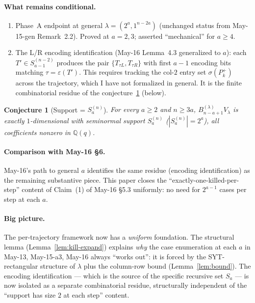 \documentclass[11pt]{article}
\newtheorem{conjecture}[theorem]{Conjecture}
\theoremstyle{definition}
\begin{document}
\paragraph{What remains conditional.}
\begin{enumerate}[leftmargin=2em,topsep=0.3em,itemsep=0.2em]
\item Phase~A endpoint at general $\lambda=(2^a,1^{n-2a})$
(unchanged status from May-15-gen Remark~2.2).  Proved at
$a=2,3$; asserted ``mechanical'' for $a\ge 4$.
\item The L/R encoding identification (May-16 Lemma~4.3 generalized
to $a$): each $T'\in S_{a-1}^{(n-2)}$ produces the pair
$\{T_{\tau L},T_{\tau R}\}$ with first $a{-}1$ encoding bits matching
$\tau=\varepsilon(T')$.  This requires tracking the col-$2$ entry
set $\sigma(P_k^+)$ across the trajectory, which I have not
formalized in general.  It is the finite combinatorial residue of
the conjecture~\ref{cor:Sa-conj} (below).
\end{enumerate}

\begin{conjecture}[Support = $S_a^{(n)}$]\label{cor:Sa-conj}
For every $a\ge 2$ and $n\ge 3a$, $B_{n-a+1}^{(\lambda)}V_\lambda$
is exactly $1$-dimensional with seminormal support $S_a^{(n)}$
($|S_a^{(n)}|=2^a$), all coefficients nonzero in $\mathbb{Q}(q)$.
\end{conjecture}

\paragraph{Comparison with May-16 §6.}  May-16's path to general
$a$ identifies the same residue (encoding identification) as the
remaining substantive piece.  This paper closes the
``exactly-one-killed-per-step'' content of Claim~(1) of May-16
\S5.3 uniformly: no need for $2^{a-1}$ cases per step at each $a$.

\paragraph{Big picture.}  The per-trajectory framework now has a
\emph{uniform} foundation.  The structural lemma
(Lemma~\ref{lem:kill-expand}) explains \emph{why} the case
enumeration at each $a$ in May-13, May-15-a3, May-16 always
``works out'': it is forced by the SYT-rectangular structure of
$\lambda$ plus the column-row bound (Lemma~\ref{lem:bound}).
The encoding identification — which is the source of the
specific recursive set $S_a$ — is now isolated as a separate
combinatorial residue, structurally independent of the
``support has size $2$ at each step'' content.
\end{document}
